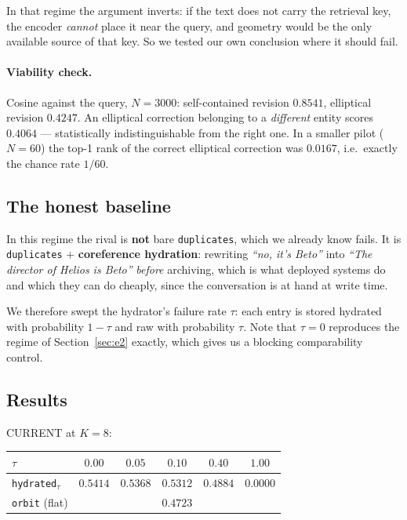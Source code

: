 \documentclass[11pt,a4paper]{article}
\begin{document}
In that regime the argument inverts: if the text does not carry the retrieval key, the encoder
\emph{cannot} place it near the query, and geometry would be the only available source of that key.
So we tested our own conclusion where it should fail.

\paragraph{Viability check.} Cosine against the query, $N=3000$: self-contained revision $0.8541$,
elliptical revision $0.4247$. An elliptical correction belonging to a \emph{different} entity scores
$0.4064$ --- statistically indistinguishable from the right one. In a smaller pilot ($N=60$) the
top-1 rank of the correct elliptical correction was $0.0167$, i.e.\ exactly the chance rate $1/60$.

\subsection{The honest baseline}

In this regime the rival is \textbf{not} bare \texttt{duplicates}, which we already know fails. It is
\texttt{duplicates} + \textbf{coreference hydration}: rewriting \emph{``no, it's Beto''} into
\emph{``The director of Helios is Beto''} \emph{before} archiving, which is what deployed systems do
and which they can do cheaply, since the conversation is at hand at write time.

We therefore swept the hydrator's failure rate $\tau$: each entry is stored hydrated with probability
$1-\tau$ and raw with probability $\tau$. Note that $\tau = 0$ reproduces the regime of
Section~\ref{sec:e2} exactly, which gives us a blocking comparability control.

\subsection{Results}

CURRENT at $K=8$:

\begin{center}
\begin{tabular}{lccccc}
\toprule
$\tau$ & $0.00$ & $0.05$ & $0.10$ & $0.40$ & $1.00$ \\
\midrule
\texttt{hydrated}$_\tau$ & $0.5414$ & $0.5368$ & $0.5312$ & $0.4884$ & $\mathbf{0.0000}$ \\
\texttt{orbit} (flat)    & \multicolumn{5}{c}{$0.4723$} \\
\bottomrule
\end{tabular}
\end{center}
\end{document}
